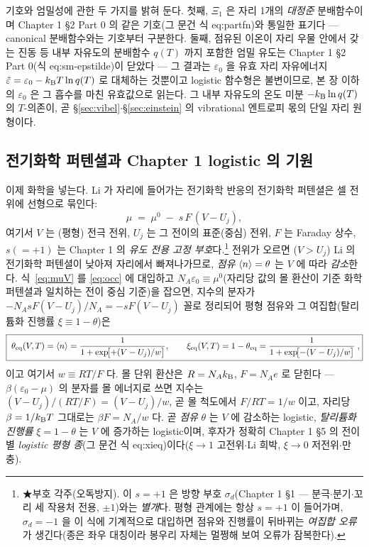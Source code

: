 기호와 엄밀성에 관한 두 가지를 밝혀 둔다. 첫째, $\Xi_1$ 은 자리 1개의 \emph{대정준} 분배함수이며 Chapter 1 §2
Part 0 의 같은 기호(그 문건 식 eq:partfn)와 통일한 표기다 --- canonical 분배함수와는 기호부터 구분한다.
둘째, 점유된 이온이 자리 우물 안에서 갖는 진동 등 내부 자유도의 분배함수 $q(T)$ 까지 포함한 엄밀 유도는
Chapter 1 §2 Part 0(식 eq:sm-epstilde)이 닫았다 --- 그 결과는 $\varepsilon_0$ 을 유효 자리 자유에너지
$\tilde\varepsilon=\varepsilon_0-k_{\mathrm B} T\ln q(T)$ 로 대체하는 것뿐이고 logistic 함수형은 불변이므로, 본 장 이하의
$\varepsilon_0$ 은 그 흡수를 마친 유효값으로 읽는다. 그 내부 자유도의 온도 미분 $-k_{\mathrm B}\ln q(T)$ 의 $T$-의존이,
곧 \S\ref{sec:vibel}$\cdot$\S\ref{sec:einstein} 의 vibrational 엔트로피 몫의 단일 자리 원형이다.

\subsection{전기화학 퍼텐셜과 Chapter 1 logistic 의 기원}\label{ssec:logistic}
이제 화학을 넣는다. Li 가 자리에 들어가는 전기화학 반응의 전기화학 퍼텐셜은 셀 전위에 선형으로 묶인다:
\begin{equation}
\mu \;=\; \mu^0 \;-\; s\,F\,(V-U_j),
\label{eq:muV}
\end{equation}
여기서 $V$ 는 (평형) 전극 전위, $U_j$ 는 그 전이의 표준(중심) 전위, $F$ 는 Faraday 상수, $s(=+1)$ 는
Chapter 1 의 \emph{유도 전용 고정 부호}다.\footnote{★부호 각주(오독방지). 이 $s{=}+1$ 은 방향 부호
$\sigma_d$(Chapter 1 §1 --- 분극$\cdot$분기$\cdot$꼬리 세 작용처 전용, $\pm1$)와는 \emph{별개}다. 평형 관계에는
항상 $s{=}+1$ 이 들어가며, $\sigma_d{=}-1$ 을 이 식에 기계적으로 대입하면 점유와 진행률이 뒤바뀌는
\emph{여집합 오류}가 생긴다(종은 좌우 대칭이라 봉우리 자체는 멀쩡해 보여 오류가 잠복한다).} 전위가 오르면
($V>U_j$) Li 의 전기화학 퍼텐셜이 낮아져 자리에서 빠져나가므로, \emph{점유} $\langle n\rangle=\theta$ 는 $V$ 에 따라
\emph{감소}한다. 식~\eqref{eq:muV} 를 \eqref{eq:occ} 에 대입하고 $N_A\varepsilon_0\equiv\mu^0$(자리당 값의 몰
환산이 기준 화학퍼텐셜과 일치하는 전이 중심 기준)을 잡으면, 지수의 분자가 $-N_A s F(V-U_j)/N_A=-sF(V-U_j)$
꼴로 정리되어 평형 점유와 그 여집합(탈리튬화 진행률 $\xi\equiv1-\theta$)은
\begin{equation}
\boxed{\;\theta_{\mathrm{eq}}(V,T)=\langle n\rangle=\frac{1}{1+\exp\!\bigl[+(V-U_j)/w\bigr]},\qquad
\xi_{\mathrm{eq}}(V,T)=1-\theta_{\mathrm{eq}}=\frac{1}{1+\exp\!\bigl[-(V-U_j)/w\bigr]}\;,}
\label{eq:logistic}
\end{equation}
이고 여기서 $w\equiv RT/F$ 다. 몰 단위 환산은 $R=N_Ak_{\mathrm B}$, $F=N_Ae$ 로 닫힌다 --- $\beta(\varepsilon_0-\mu)$ 의
분자를 몰 에너지로 쓰면 지수는 $(V-U_j)/(RT/F)=(V-U_j)/w$, 곧 몰 척도에서 $F/RT=1/w$ 이고, 자리당
$\beta=1/k_{\mathrm B} T$ 그대로는 $\beta F=N_A/w$ 다. 곧 \emph{점유} $\theta$ 는 $V$ 에 감소하는 logistic, \emph{탈리튬화
진행률} $\xi=1-\theta$ 는 $V$ 에 증가하는 logistic이며, 후자가 정확히 Chapter 1 §5 의 전이별 \emph{logistic
평형 종}(그 문건 식 eq:xieq)이다($\xi\to1$ 고전위$\cdot$Li 희박, $\xi\to0$ 저전위$\cdot$만충).

